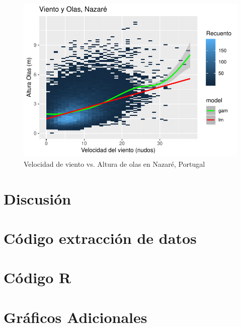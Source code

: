 \begin{figure}[H]
    \centering
    \includegraphics{./figures/nazare_all.pdf}
    \caption{Velocidad de viento vs. Altura de olas en Nazaré, Portugal}
    \label{fig:wind_waves_nazare_all}
\end{figure}


\section{Discusión}%
\label{sec:discusión}

\pagebreak
\appendix

\section{Código extracción de datos}%
\label{sec:codigo_extraccion_de_datos}



\pagebreak

\section{Código R}%
\label{sec:codigo_r}



\section{Gráficos Adicionales}
\label{sec:extra_plots}



